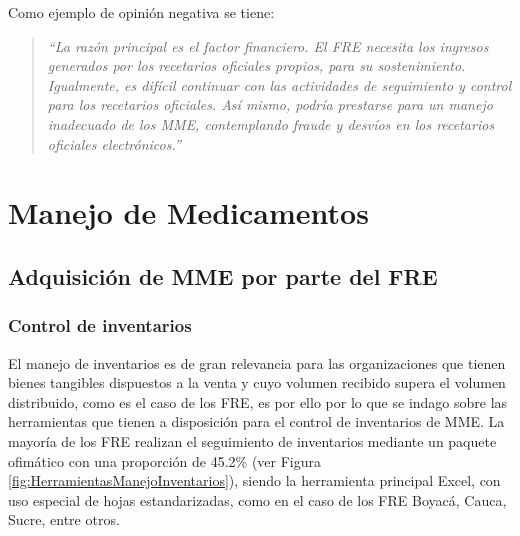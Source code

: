 \documentclass[
]{book}
\begin{document}
Como ejemplo de opinión negativa se tiene:

\begin{quote}
\emph{``La razón principal es el factor financiero. El FRE necesita los ingresos generados por los recetarios oficiales propios, para su sostenimiento. Igualmente, es difícil continuar con las actividades de seguimiento y control para los recetarios oficiales. Así mismo, podría prestarse para un manejo inadecuado de los MME, contemplando fraude y desvíos en los recetarios oficiales electrónicos.''}
\end{quote}

\hypertarget{manejo-de-medicamentos}{%
\chapter{Manejo de Medicamentos}\label{manejo-de-medicamentos}}


\hypertarget{adquisiciuxf3n-de-mme-por-parte-del-fre}{%
\section{Adquisición de MME por parte del FRE}\label{adquisiciuxf3n-de-mme-por-parte-del-fre}}


\hypertarget{control-de-inventarios}{%
\subsection{Control de inventarios}\label{control-de-inventarios}}

El manejo de inventarios es de gran relevancia para las organizaciones que tienen bienes tangibles dispuestos a la venta y cuyo volumen recibido supera el volumen distribuido, como es el caso de los FRE, es por ello por lo que se indago sobre las herramientas que tienen a disposición para el control de inventarios de MME. La mayoría de los FRE realizan el seguimiento de inventarios mediante un paquete ofimático con una proporción de 45.2\% (ver Figura \ref{fig:HerramientasManejoInventarios}), siendo la herramienta principal Excel, con uso especial de hojas estandarizadas, como en el caso de los FRE Boyacá, Cauca, Sucre, entre otros.
\end{document}
